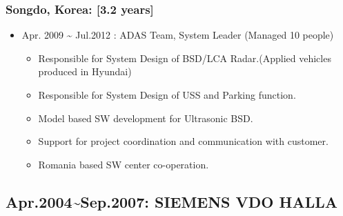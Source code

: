 \documentclass[12pt,a4paper]{article}
\begin{document}
\subsubsection{Songdo, Korea: [3.2 years]}
\begin{itemize}
\item Apr. 2009 {\textasciitilde} Jul.2012 : ADAS Team, System Leader (Managed 10 people)

\begin{itemize}
\item Responsible for System Design of BSD/LCA Radar.(Applied vehicles produced in Hyundai)


\item Responsible for System Design of USS and Parking function.


\item Model based SW development for Ultrasonic BSD.


\item Support for project coordination and communication with customer.


\item Romania based SW center co-operation.

\end{itemize}
\end{itemize}
\subsection{Apr.2004{\textasciitilde}Sep.2007: SIEMENS VDO HALLA}
\end{document}
